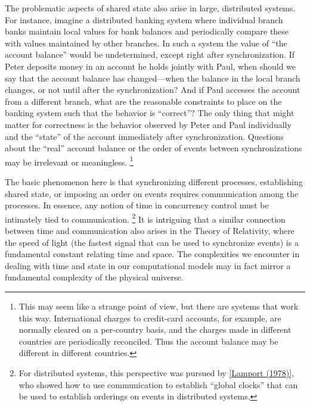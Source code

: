 The problematic aspects of shared state also arise in large, distributed systems.
For instance, imagine a distributed banking system where individual branch banks maintain local values for bank balances and periodically compare these with values maintained by other branches.
In such a system the value of “the account balance” would be undetermined, except right after synchronization.
If Peter deposits money in an account he holds jointly with Paul, when should we say that the account balance has changed---when the balance in the local branch changes, or not until after the synchronization?
And if Paul accesses the account from a different branch, what are the reasonable constraints to place on the banking system such that the behavior is “correct”?
The only thing that might matter for correctness is the behavior observed by Peter and Paul individually and the “state” of the account immediately after synchronization.
Questions about the “real” account balance or the order of events between synchronizations may be irrelevant or meaningless.%
\footnote{
	This may seem like a strange point of view, but there are systems that work this way.
	International charges to credit-card accounts, for example, are normally cleared on a per-country basis, and the charges made in different countries are periodically reconciled.
	Thus the account balance may be different in different countries.
}

The basic phenomenon here is that synchronizing different processes, establishing shared state, or imposing an order on events requires communication among the processes.
In essence, any notion of time in concurrency control must be intimately tied to communication.%
\footnote{
	For distributed systems, this perspective was pursued by \cref{Lamport (1978)}, who showed how to use communication to establish “global clocks” that can be used to establish orderings on events in distributed systems.
}
It is intriguing that a similar connection between time and communication also arises in the Theory of Relativity, where the speed of light (the fastest signal that can be used to synchronize events) is a fundamental constant relating time and space.
The complexities we encounter in dealing with time and state in our computational models may in fact mirror a fundamental complexity of the physical universe.
